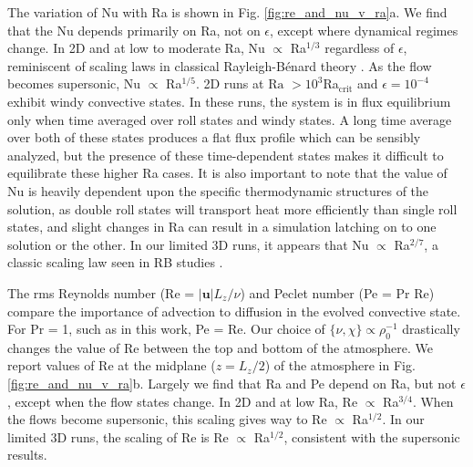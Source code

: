 \documentclass[aps, prl, twocolumn, nofootinbib, groupedaddress, amsfonts, amssymb, amsmath]{revtex4-1}
\newcommand{\RB}{Rayleigh-B\'{e}nard }
\begin{document}
The variation of Nu with Ra is shown in 
Fig. \ref{fig:re_and_nu_v_ra}a.  We find that the Nu depends primarily
on Ra, not on $\epsilon$, except where dynamical regimes change.
In 2D and at low to moderate Ra, 
Nu $\propto$ Ra$^{1/3}$ regardless of $\epsilon$,
reminiscent of scaling laws in classical \RB theory \cite{king&all2012}.
As the flow becomes supersonic,  Nu $\propto$ Ra$^{1/5}$.
2D runs at $\text{Ra }> 10^3$Ra$_{\text{crit}}$
and $\epsilon = 10^{-4}$ exhibit windy convective states.
In these runs, the system is in flux equilibrium only when
time averaged over roll states and windy states.
A long time average
over both of these states produces a flat flux profile which
can be sensibly analyzed, but the presence of these time-dependent states
makes it difficult to equilibrate these higher Ra cases.
It is also important to note that
the value of Nu is heavily dependent upon the specific thermodynamic
structures of the solution, as double roll states will transport
heat more efficiently than single roll states, and slight changes in
Ra can result in a simulation latching on to one solution or the other.
In our limited 3D runs, it appears that Nu $\propto$ Ra$^{2/7}$, a classic scaling law
seen in RB studies \cite{johnston&doering2009}.

The rms Reynolds number (Re = $|\bm{u}|L_z/\nu$) and Peclet number
(Pe = Pr Re)
compare the importance of advection to diffusion in the evolved
convective state.  For Pr = 1, such as in this work, Pe = Re.  
Our choice of $\{\nu,\chi\}\propto \rho_0^{-1}$ drastically changes
the value of Re between the top and bottom of the atmosphere.  We report values of
Re at the midplane ($z=L_z/2$) of the atmosphere in
Fig. \ref{fig:re_and_nu_v_ra}b.  Largely we find that Ra and
Pe depend on Ra, but not $\epsilon$, except when the flow states
change.
In 2D and at low Ra, Re $\propto$ Ra$^{3/4}$.  When the flows
become supersonic, 
this scaling gives way to Re $\propto$ Ra$^{1/2}$.
In our limited 3D runs, the scaling of Re is
Re $\propto$ Ra$^{1/2}$, consistent with the supersonic results.
\end{document}
